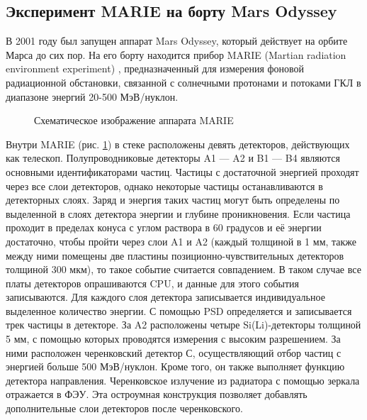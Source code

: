 \documentclass[12pt,a4paper]{report} %
\begin{document}
\subsection{Эксперимент MARIE на борту Mars Odyssey}
В 2001 году был запущен аппарат Mars Odyssey, который действует на орбите Марса до сих пор. На его борту находится прибор MARIE (Martian radiation environment experiment) \cite{MARIE}, предназначенный для измерения фоновой радиационной обстановки, связанной с солнечными протонами и потоками ГКЛ в диапазоне энергий 20-500 МэВ/нуклон. 
\begin{figure}
	\noindent{}
	\caption{Схематическое изображение аппарата MARIE}
	\label{figMARIE}
\end{figure}
Внутри MARIE (рис. \ref{figMARIE}) в стеке расположены девять детекторов, действующих как телескоп. Полупроводниковые детекторы A1 --- A2 и B1 --- B4 являются основными идентификаторами частиц. Частицы с достаточной энергией проходят через все слои детекторов, однако некоторые частицы останавливаются в детекторных слоях.  Заряд и энергия таких частиц могут быть определены по выделенной в слоях детектора энергии и глубине проникновения. Если частица проходит в пределах конуса с углом раствора в 60 градусов и её энергии достаточно, чтобы пройти через слои A1 и A2 (каждый толщиной в 1 мм, также между ними помещены две пластины позиционно-чувствительных детекторов толщиной 300 мкм), то такое событие считается совпадением. В таком случае все платы детекторов опрашиваются CPU, и данные для этого события записываются. Для каждого слоя детектора записывается индивидуальное выделенное количество энергии. С помощью PSD определяется и записывается трек частицы в детекторе. За A2 расположены четыре Si(Li)-детекторы толщиной 5 мм, с помощью которых проводятся измерения с высоким разрешением. За ними расположен черенковский детектор С, осуществляющий отбор частиц с энергией больше 500 МэВ/нуклон. Кроме того, он также выполняет функцию детектора направления. 
Черенковское излучение из радиатора с помощью зеркала отражается в ФЭУ. Эта остроумная конструкция позволяет добавлять дополнительные слои детекторов после черенковского. 
\end{document}
